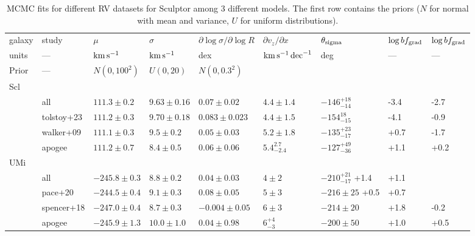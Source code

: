 \begin{landscape}
\begin{table*}[t]
\centering
\caption[Sculptor RV fits]{MCMC fits for different RV datasets for Sculptor among 3 different models. The first row contains the priors ($N$ for normal with mean and variance, $U$ for uniform distributions). }
\label{tbl:scl_rv_mcmc}
\begin{tabular}{lllllllll}
\toprule
galaxy & study & $\mu$ & $\sigma$ & $\partial \log\sigma / \partial \log R$ & $\partial v_z / \partial x$  & $\theta_{\rm sigma}$ & $\log bf_{\rm grad}$ & $\log bf_{\rm grad}$\\
units & --- & ${\rm km\,s^{-1}}$ & ${\rm km\,s^{-1}}$ & dex & ${\rm km\,s^{-1}}\,{\rm dec}^{-1}$ & deg & --- & --- \\
\midrule
Prior & --- & $N(0, 100^2)$ & $U(0, 20)$ & $N(0, 0.3^2)$ \\
Scl \\
& all  & $111.3\pm0.2$ & $9.63\pm0.16$ & $0.07\pm0.02$ & $4.4 \pm 1.4$& $-146_{-14}^{+18}$ & -3.4 & -2.7\\
& tolstoy+23 & $111.2 \pm 0.3$ & $9.70\pm0.18$ & $0.083 \pm 0.023$ & $4.4\pm1.5$ & $-154_{-15}^{18}$ & -4.1 & -0.9 \\
& walker+09 & $111.1\pm0.3$ & $9.5\pm0.2$ & $0.05\pm0.03$ & $5.2\pm1.8$ & $-135_{-17}^{+23}$ & +0.7 & -1.7 \\
& apogee  & $111.2\pm0.7$ & $8.4\pm0.5$ & $0.06\pm0.06$ & $5.4_{-2.4}^{2.7}$ & $-127_{-36}^{+49}$ & +1.1 & +0.2 \\
\midrule
UMi \\
& all & $-245.8\pm0.3$ & $8.8\pm0.2$ & $0.04 \pm 0.03$ & $4 \pm 2$ & $-210_{-17}^{+21}$ +1.4 & +1.1 \\
& pace+20 & $-244.5\pm0.4$ & $9.1\pm0.3$ & $0.08 \pm 0.05$ & $5\pm3$ & $-216 \pm 25$ +0.5 & +0.7 \\
& spencer+18 & $-247.0\pm0.4$ & $8.7\pm0.3$ & $-0.004 \pm 0.05$ & $6 \pm 3$ & $-214\pm20$ & +1.8 & -0.2 \\
& apogee & $-245.9\pm1.3$ & $10.0\pm1.0$ & $0.04 \pm 0.98$ & $6_{-3}^{+4}$ & $-200\pm50$ & +1.0 & +0.5 \\
\bottomrule
\end{tabular}
\end{table*}

\end{landscape}
